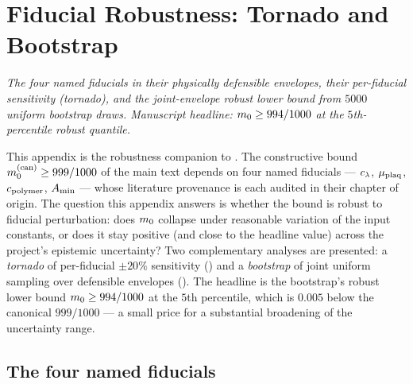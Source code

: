 %

\chapter{Fiducial Robustness:
  Tornado and Bootstrap}
\label{ch:appx-fiducials}

\noindent\emph{The four named fiducials in their physically
defensible envelopes, their per-fiducial sensitivity (tornado), and
the joint-envelope robust lower bound from $5000$ uniform bootstrap
draws.  Manuscript headline:
$m_0 \ge 994/1000$ at the $5$th-percentile robust quantile.}

This appendix is the robustness companion to
.  The constructive bound
$m_0^{(\mathrm{can})} \ge 999/1000$ of the main text depends
on four named fiducials — $c_\lambda$, $\mu_{\mathrm{plaq}}$, $c_{\mathrm{polymer}}$,
$A_{\min}$ — whose literature provenance is each audited in their
chapter of origin.  The question this appendix answers is whether
the bound is robust to fiducial perturbation: does $m_0$
collapse under reasonable variation of the input constants, or does
it stay positive (and close to the headline value) across the
project's epistemic uncertainty?  Two complementary analyses are
presented: a \emph{tornado} of per-fiducial $\pm 20\%$ sensitivity
() and a \emph{bootstrap} of joint uniform
sampling over defensible envelopes ().
The headline is the bootstrap's robust lower bound $m_0 \ge
994/1000$ at the $5$th percentile, which is $0.005$ below the
canonical $999/1000$ — a small price for a substantial
broadening of the uncertainty range.

\section{The four named fiducials}
\label{sec:appx-four-fiducials}

%

